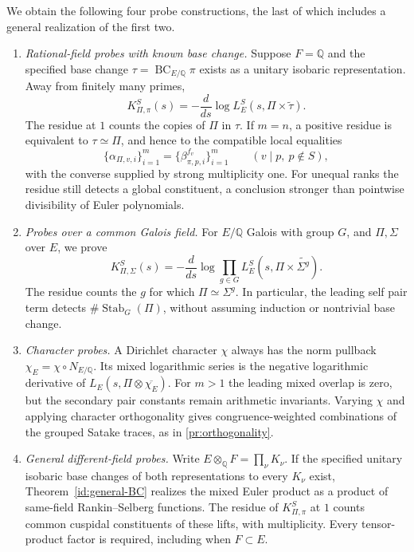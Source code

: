 \documentclass[11pt,reqno]{amsart}
\numberwithin{equation}{section}
\theoremstyle{definition}
\theoremstyle{remark}
\newcommand{\BC}{\operatorname{BC}}
\begin{document}
We obtain the following four probe constructions, the last of which includes a general realization of the first two.
\begin{enumerate}[label=\textup{(\arabic*)},leftmargin=*]
\item \emph{Rational-field probes with known base change.} Suppose $F=\mathbb Q$ and the specified base change $\tau=\BC_{E/\mathbb Q}\pi$ exists as a unitary isobaric representation. Away from finitely many primes,
\begin{equation}K_{\Pi,\pi}^S(s)=-\frac d{ds}\log L_E^S(s,\Pi\times\widetilde\tau).\label{in:probe}\end{equation}
The residue at $1$ counts the copies of $\Pi$ in $\tau$. If $m=n$, a positive residue is equivalent to $\tau\simeq\Pi$, and hence to the compatible local equalities
\begin{equation}\{\alpha_{\Pi,v,i}\}_{i=1}^m=\{\beta_{\pi,p,i}^{f_v}\}_{i=1}^m\qquad(v\mid p,\ p\notin S),\label{in:Satake}\end{equation}
with the converse supplied by strong multiplicity one. For unequal ranks the residue still detects a global constituent, a conclusion stronger than pointwise divisibility of Euler polynomials.
\item \emph{Probes over a common Galois field.} For $E/\mathbb Q$ Galois with group $G$, and $\Pi,\Sigma$ over $E$, we prove
\begin{equation}K_{\Pi,\Sigma}^S(s)=-\frac d{ds}\log\prod_{g\in G}L_E^S(s,\Pi\times\widetilde{\Sigma^g}).\label{in:Galois}\end{equation}
The residue counts the $g$ for which $\Pi\simeq\Sigma^g$. In particular, the leading self pair term detects $\#\operatorname{Stab}_G(\Pi)$, without assuming induction or nontrivial base change.
\item \emph{Character probes.} A Dirichlet character $\chi$ always has the norm pullback $\chi_E=\chi\circ N_{E/\mathbb Q}$. Its mixed logarithmic series is the negative logarithmic derivative of $L_E(s,\Pi\otimes\overline{\chi_E})$. For $m>1$ the leading mixed overlap is zero, but the secondary pair constants remain arithmetic invariants. Varying $\chi$ and applying character orthogonality gives congruence-weighted combinations of the grouped Satake traces, as in \eqref{pr:orthogonality}.
\item \emph{General different-field probes.} Write $E\otimes_{\mathbb Q}F=\prod_\nu K_\nu$. If the specified unitary isobaric base changes of both representations to every $K_\nu$ exist, Theorem~\ref{id:general-BC} realizes the mixed Euler product as a product of same-field Rankin--Selberg functions. The residue of $K_{\Pi,\pi}^S$ at $1$ counts common cuspidal constituents of these lifts, with multiplicity. Every tensor-product factor is required, including when $F\subset E$.
\end{enumerate}
\end{document}

